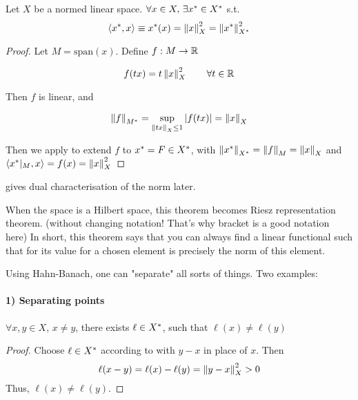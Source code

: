 \documentclass{article}
\begin{document}
\begin{theorem}
\label{existence of functional equals norm squared}\label{dual charaterization of norm}
	Let $X$ be a normed linear space. $\forall x\in X,\,\exists x^*\in {X}^*$ s.t. $$\left<{{x}^*},{x}\right>\equiv{x}^*(x)=\left\|{x}\right\|^2_X=\left\|{{x}^*}\right\|^2_{{X}^*}$$
\end{theorem}

\begin{proof}
	Let $M=\text{span}(x)$. Define $f: M \to \mathbb{R}$
	
	$$f(tx)=t\left\|{x}\right\|^2_X \qquad \forall t\in \mathbb{R}$$
	
	Then $f$ is linear, and 
	
	$$\left\|{f}\right\|_{{M}^*} = \sup_{\left\|{tx}\right\|_X \leq 1} |f(tx)| = \left\|{x}\right\|_X$$
	
	Then we apply  to extend $f$ to ${x}^*=F\in {X}^*$, with $\left\|{{x}^*}\right\|_{{X}^*}=\left\|{f}\right\|_M=\left\|{x}\right\|_X$ and $\left<{{x}^*|_{M}},{x}\right>=f(x)=\left\|{x}\right\|_X^2$
\end{proof}

\begin{remark}
     gives dual characterisation of the norm later.  
    \begin{unexaminable}
        When the space is a Hilbert space, this theorem becomes Riesz representation theorem. (without changing notation! That's why bracket is a good notation here) In short, this theorem says that you can always find a linear functional such that for its value for a chosen element is precisely the norm of this element.
    \end{unexaminable}
\end{remark}  

Using Hahn-Banach, one can "separate" all sorts of things. Two examples:  

\paragraph{1) Separating points}  

\begin{proposition}
\label{dual elements separate points}
$\forall x,y \in X$, $x\neq y$, there exists $\ell \in {X}^*$, such that $\ell(x) \neq \ell(y)$
\end{proposition}  

\begin{proof}
    Choose $\ell \in {X}^*$ according to  with $y-x$ in place of $x$.  
    Then  
    $$\ell (x-y) = \ell(x) - \ell(y) = \left\|{y-x}\right\|^2_X >0$$ 
    Thus, $\ell(x) \neq \ell(y)$.
\end{proof}
\end{document}
